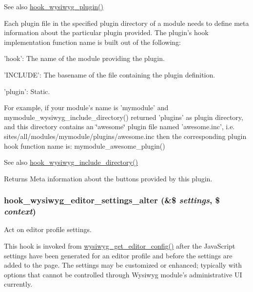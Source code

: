 \begin{DoxySeeAlso}{See also}
\hyperlink{wysiwyg_8api_8php_abad2b35b32be0b20d73006b73205045c}{hook\_\-wysiwyg\_\-plugin()}
\end{DoxySeeAlso}
Each plugin file in the specified plugin directory of a module needs to define meta information about the particular plugin provided. The plugin's hook implementation function name is built out of the following:
\begin{DoxyItemize}
\item 'hook': The name of the module providing the plugin.
\item 'INCLUDE': The basename of the file containing the plugin definition.
\item 'plugin': Static.
\end{DoxyItemize}

For example, if your module's name is 'mymodule' and mymodule\_\-wysiwyg\_\-include\_\-directory() returned 'plugins' as plugin directory, and this directory contains an \char`\"{}awesome\char`\"{} plugin file named 'awesome.inc', i.e. sites/all/modules/mymodule/plugins/awesome.inc then the corresponding plugin hook function name is: mymodule\_\-awesome\_\-plugin()

\begin{DoxySeeAlso}{See also}
\hyperlink{wysiwyg_8api_8php_a6cfdf97fd9de777197d9bae384755aac}{hook\_\-wysiwyg\_\-include\_\-directory()}
\end{DoxySeeAlso}
\begin{DoxyReturn}{Returns}
Meta information about the buttons provided by this plugin. 
\end{DoxyReturn}
\hypertarget{wysiwyg_8api_8php_a5a5a169876eb8a8f2d19c214408d1072}{
\subsubsection[{hook\_\-wysiwyg\_\-editor\_\-settings\_\-alter}]{\setlength{\rightskip}{0pt plus 5cm}hook\_\-wysiwyg\_\-editor\_\-settings\_\-alter (\&\$ {\em settings}, \/  \$ {\em context})}}
\label{wysiwyg_8api_8php_a5a5a169876eb8a8f2d19c214408d1072}
Act on editor profile settings.

This hook is invoked from \hyperlink{wysiwyg_8module_ab78fc846dcedb3edb5adb2b45484b035}{wysiwyg\_\-get\_\-editor\_\-config()} after the JavaScript settings have been generated for an editor profile and before the settings are added to the page. The settings may be customized or enhanced; typically with options that cannot be controlled through Wysiwyg module's administrative UI currently.

